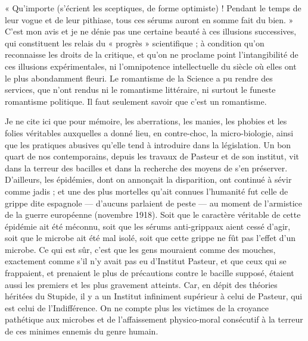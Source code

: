\documentclass[french,twoside]{book} %
\begin{document}
« Qu’importe (s’écrient les sceptiques, de forme optimiste) ! Pendant le temps de leur vogue et de leur pithiase, tous ces sérums auront en somme fait du bien. » C’est mon avis et je ne dénie pas une certaine beauté à ces illusions successives, qui constituent les relais du « progrès » scientifique ; à condition qu’on reconnaisse les droits de la critique, et qu’on ne proclame point l’intangibilité de ces illusions expérimentales, ni l’omnipotence intellectuelle du siècle où elles ont le plus abondamment fleuri. Le romantisme de la Science a pu rendre des services, que n’ont rendus ni le romantisme littéraire, ni surtout le funeste romantisme politique. Il faut seulement savoir que c’est un romantisme.\par
Je ne cite ici que pour mémoire, les aberrations, les manies, les phobies et les folies véritables auxquelles a donné lieu, en contre-choc, la micro-biologie, ainsi que les pratiques abusives qu’elle tend à introduire dans la législation. Un bon quart de nos contemporains, depuis les travaux de Pasteur et de son institut, vit dans la terreur des bacilles et dans la recherche des moyens de s’en préserver. D’ailleurs, les épidémies, dont on annonçait la disparition, ont continué à sévir comme jadis ; et une des plus mortelles qu’ait connues l’humanité fut celle de grippe dite espagnole — d’aucuns parlaient de peste — au moment de l’armistice de la guerre européenne (novembre 1918). Soit que le caractère véritable de cette épidémie ait été méconnu, soit que les sérums anti-grippaux aient cessé d’agir, soit que le microbe ait été mal isolé, soit que cette grippe ne fût pas l’effet d’un microbe. Ce qui est sûr, c’est que les gens mouraient comme des mouches, exactement comme s’il n’y avait pas eu d’Institut Pasteur, et que ceux qui se frappaient, et prenaient le plus de précautions contre le bacille supposé, étaient aussi les premiers et les plus gravement atteints. Car, en dépit des théories héritées du Stupide, il y a un Institut infiniment supérieur à celui de Pasteur, qui est celui de l’Indifférence. On ne compte plus les victimes de la croyance pathétique aux microbes et de l’affaissement physico-moral consécutif à la terreur de ces minimes ennemis du genre humain.\par
\end{document}
